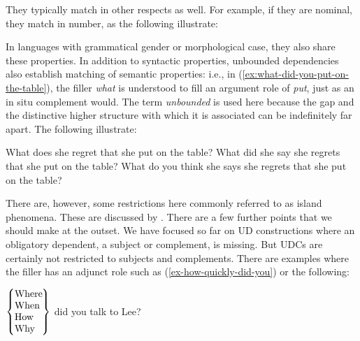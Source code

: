 \documentclass[output=paper
,notxmath 
	        ,collection
	        ,collectionchapter
 	        ,biblatex
                ,babelshorthands
                ,newtxmath
                ,draftmode
                ,colorlinks, citecolor=brown
]{langscibook}
\begin{document}
\noindent They typically match
in other respects as well. For example, if they are nominal, they
match in number, as the following illustrate:

\begin{exe}
  \ex \begin{xlist} \label{ex:UDC:4} 
      \end{xlist} \end{exe}

\noindent In languages with
grammatical gender or morphological case, they also share these
properties.  In addition to syntactic properties, unbounded
dependencies also establish matching of semantic properties: i.e.,
in (\ref{ex:what-did-you-put-on-the-table}), the filler \textit{what} is understood to
fill an argument role of \textit{put}, just as an in situ complement
would.  The term \emph{unbounded} is used here because the gap and the
distinctive higher structure with which it is associated can be
indefinitely far apart. The following illustrate:

\eal
\label{ex:UDC:5} 
\ex What does she regret that she put \trace{} on the table?
\ex What did she say she regrets that she put \trace{} on the table?
\ex What do you think she says she regrets that she put \trace{} on the table?
\zl

\noindent There are, however, some
restrictions here commonly referred to as island phenomena. These
are discussed by .  There are a few
further points that we should make at the outset. We have focused so
far on UD constructions where an obligatory dependent, a subject or
complement, is missing. But UDCs are certainly not restricted to
subjects and complements.  There are examples where the filler has
an adjunct role such as (\ref{ex-how-quickly-did-you}) or the following:

\ea
\label{ex:UDC:6}
$\begin{array}{@{}l@{}}
\left\{%
\begin{tabular}{@{}l@{}}
  Where\hspace{-.09em}\mbox{}\\
  When\\
  How\\
  Why\\
\end{tabular}\right\}
\end{array}$
did you talk to Lee\trace{}?
\z
\end{document}
